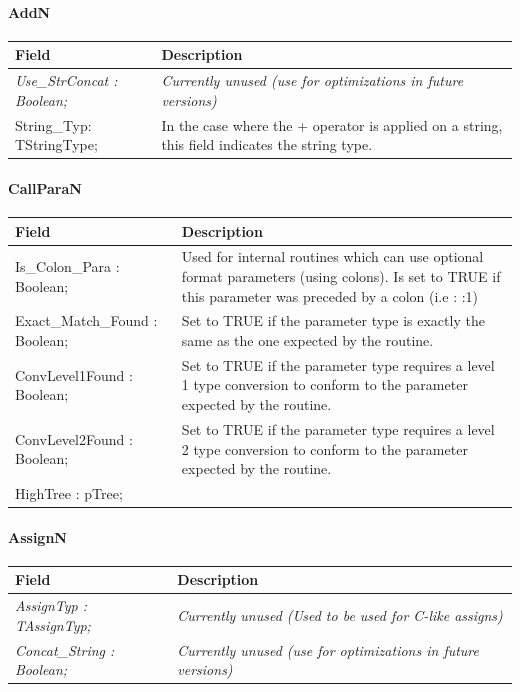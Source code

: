 \documentclass [a4paper,12pt]{article}
\begin{document}
\paragraph{AddN}\mbox{}

\begin{longtable}{|l|p{10cm}|}
\hline
Field   & Description \\
\hline
\endhead
\hline
\endfoot
\textsf{\textit{Use{\_}StrConcat : Boolean;}}&
    \textit{Currently unused (use for optimizations in future versions)} \\
\hline
\textsf{String{\_}Typ: TStringType;}&
    In the case where the + operator is applied on a string, this field indicates the string type. \\
\hline
\end{longtable}

\paragraph{CallParaN}\mbox{}

\begin{longtable}{|l|p{10cm}|}
\hline
Field   & Description \\
\hline
\endhead
\hline
\endfoot
\textsf{Is{\_}Colon{\_}Para : Boolean;}&
    Used for internal routines which can use optional format parameters
    (using colons). Is set to TRUE if this parameter was preceded by a
    colon (i.e : :1) \\
\textsf{Exact{\_}Match{\_}Found : Boolean;}&
    Set to TRUE if the parameter type is exactly the same as the one
    expected by the routine. \\
\textsf{ConvLevel1Found : Boolean;}&
    Set to TRUE if the parameter type requires a level 1 type conversion
    to conform to the parameter expected by the routine. \\
\textsf{ConvLevel2Found : Boolean;}&
    Set to TRUE if the parameter type requires a level 2 type conversion
    to conform to the parameter expected by the routine. \\
\textsf{HighTree : pTree;}&  \\
\hline
\end{longtable}

\paragraph{AssignN}\mbox{}

\begin{longtable}{|l|p{10cm}|}
\hline
Field   & Description \\
\hline
\endhead
\hline
\endfoot
\textsf{\textit{AssignTyp : TAssignTyp;}}&
    \textit{Currently unused (Used to be used for C-like assigns)} \\
\textsf{\textit{Concat{\_}String : Boolean;}}&
    \textit{Currently unused (use for optimizations in future versions)}\\
\hline
\end{longtable}
\end{document}
